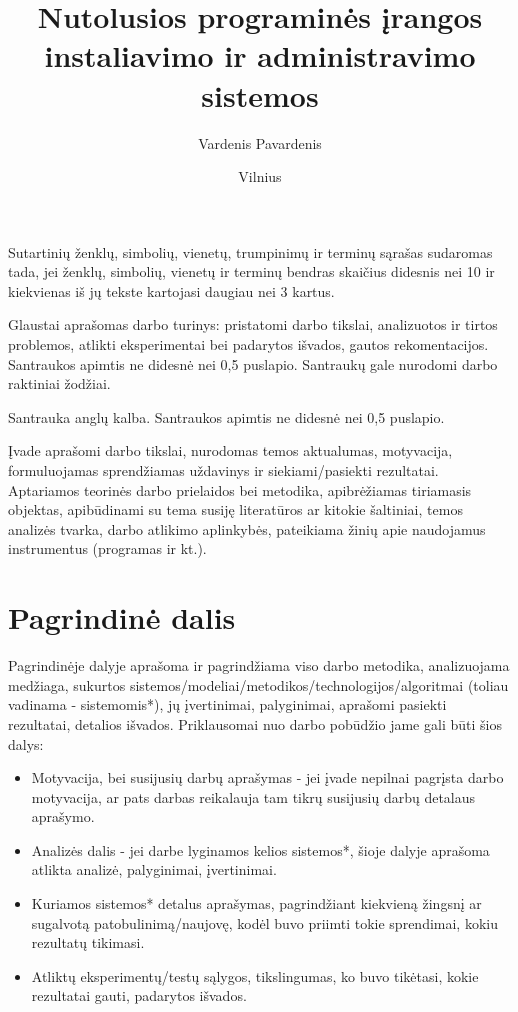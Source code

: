 \documentclass{VUMIFKompMagistrinis}
\title{Nutolusios programinės įrangos instaliavimo ir administravimo sistemos}
\author{Vardenis Pavardenis}
\date{Vilnius \\ \the\year}
\begin{document}
\maketitle

\tableofcontents

Sutartinių ženklų, simbolių, vienetų, trumpinimų ir terminų sąrašas sudaromas
tada, jei ženklų, simbolių, vienetų ir terminų bendras skaičius didesnis nei 10
ir kiekvienas iš jų tekste kartojasi daugiau nei 3 kartus. 

Glaustai aprašomas darbo turinys: pristatomi darbo tikslai, analizuotos ir
tirtos problemos, atlikti eksperimentai bei padarytos išvados, gautos
rekomentacijos. Santraukos apimtis ne didesnė nei 0,5 puslapio. Santraukų gale
nurodomi darbo raktiniai žodžiai. 

Santrauka anglų kalba. Santraukos apimtis ne didesnė nei 0,5 puslapio.


Įvade aprašomi darbo tikslai, nurodomas temos aktualumas, motyvacija,
formuluojamas sprendžiamas uždavinys ir siekiami/pasiekti rezultatai.
Aptariamos teorinės darbo prielaidos bei metodika, apibrėžiamas tiriamasis
objektas, apibūdinami su tema susiję literatūros ar kitokie šaltiniai, temos
analizės tvarka, darbo atlikimo aplinkybės, pateikiama žinių apie naudojamus
instrumentus (programas ir kt.).

\section{Pagrindinė dalis}
Pagrindinėje dalyje aprašoma ir pagrindžiama viso darbo metodika, analizuojama
medžiaga, sukurtos sistemos/modeliai/metodikos/technologijos/algoritmai (toliau
vadinama - sistemomis*), jų įvertinimai, palyginimai, aprašomi pasiekti
rezultatai, detalios išvados. Priklausomai nuo darbo pobūdžio jame gali būti
šios dalys:
\begin{itemize}
    \item Motyvacija, bei susijusių darbų aprašymas - jei įvade nepilnai
        pagrįsta darbo motyvacija, ar pats darbas reikalauja tam tikrų
        susijusių darbų detalaus aprašymo.
    \item Analizės dalis - jei darbe lyginamos kelios sistemos*, šioje dalyje
        aprašoma atlikta analizė, palyginimai, įvertinimai.
    \item Kuriamos sistemos* detalus aprašymas, pagrindžiant kiekvieną žingsnį
        ar sugalvotą patobulinimą/naujovę, kodėl buvo priimti tokie sprendimai,
        kokiu rezultatų tikimasi.
    \item Atliktų eksperimentų/testų sąlygos, tikslingumas, ko buvo tikėtasi,
        kokie rezultatai gauti, padarytos išvados.
\end{itemize}
\end{document}
